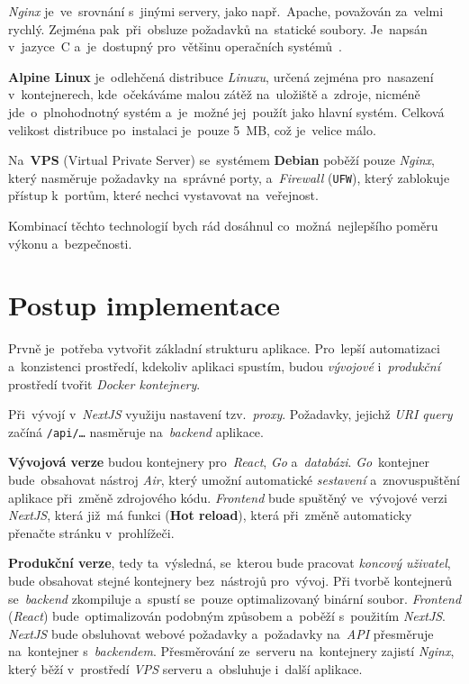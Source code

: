 \documentclass[11pt,a4paper]{report}
\begin{document}
            \emph{Nginx} je~ve~srovnání s~jinými servery, jako např.~Apache, považován za~velmi rychlý. Zejména pak~při~obsluze požadavků na~statické soubory. Je~napsán v~jazyce~C a~je~dostupný pro~většinu operačních systémů~\cite{WhatNGINX}.

            \textbf{Alpine Linux} je~odlehčená distribuce \emph{Linuxu}, určená zejména pro~nasazení v~kontejnerech, kde~očekáváme malou zátěž na~uložiště a~zdroje, nicméně jde~o~plnohodnotný systém a~je~možné jej~použít jako hlavní systém. Celková velikost distribuce po~instalaci je~pouze 5~MB, což je~velice málo.

            Na~\textbf{VPS} (Virtual Private Server) se~systémem \textbf{Debian} poběží pouze \emph{Nginx}, který nasměruje požadavky na~správné porty, a~\emph{Firewall} (\texttt{UFW}), který zablokuje přístup k~portům, které nechci vystavovat na~veřejnost.

            Kombinací těchto technologií bych rád dosáhnul co~možná~nejlepšího poměru výkonu a~bezpečnosti.
	
	\chapter{Postup implementace}
        Prvně je~potřeba vytvořit základní strukturu aplikace. Pro~lepší automatizaci a~konzistenci prostředí, kdekoliv aplikaci spustím, budou \emph{vývojové} i~\emph{produkční} prostředí tvořit \emph{Docker kontejnery}.

        Při~vývojí v~\emph{NextJS} využiju nastavení tzv.~\emph{proxy}. Požadavky, jejichž \emph{URI query} začíná \texttt{/api/\dots} nasměruje na~\emph{backend} aplikace.
        
        \textbf{Vývojová verze} budou kontejnery pro~\emph{React}, \emph{Go} a~\emph{databázi}. \emph{Go}~kontejner bude~obsahovat nástroj \emph{Air}, který umožní automatické \emph{sestavení} a~znovuspuštění aplikace při~změně zdrojového kódu. \emph{Frontend} bude spuštěný ve~vývojové verzi \emph{NextJS}, která již~má funkci (\textbf{Hot reload}), která při~změně automaticky přenačte stránku v~prohlížeči.

        \textbf{Produkční verze}, tedy ta~výsledná, se~kterou bude pracovat \emph{koncový uživatel}, bude obsahovat stejné kontejnery bez~nástrojů pro~vývoj. Při tvorbě kontejnerů se~\emph{backend} zkompiluje a~spustí se~pouze optimalizovaný binární soubor. \emph{Frontend} (\emph{React}) bude~optimalizován podobným způsobem a~poběží s~použitím \emph{NextJS}. \emph{NextJS} bude obsluhovat webové požadavky a~požadavky na~\emph{API} přesměruje na~kontejner s~\emph{backendem}. Přesměrování ze~serveru na~kontejnery zajistí \emph{Nginx}, který běží v~prostředí \emph{VPS} serveru a~obsluhuje i~další aplikace.
\end{document}
